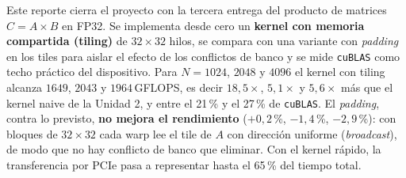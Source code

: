 \begin{abstractd}
	Este reporte cierra el proyecto con la tercera entrega del producto de matrices $C = A \times B$ en FP32. Se implementa desde cero un \textbf{kernel con memoria compartida (tiling)} de $32 \times 32$ hilos, se compara con una variante con \textit{padding} en los tiles para aislar el efecto de los conflictos de banco y se mide \texttt{cuBLAS} como techo práctico del dispositivo. Para $N = 1024$, $2048$ y $4096$ el kernel con tiling alcanza $1649$, $2043$ y $1964$\,GFLOPS, es decir $18{,}5\times$, $5{,}1\times$ y $5{,}6\times$ más que el kernel naive de la Unidad 2, y entre el 21\,\% y el 27\,\% de \texttt{cuBLAS}. El \textit{padding}, contra lo previsto, \textbf{no mejora el rendimiento} ($+0{,}2$\,\%, $-1{,}4$\,\%, $-2{,}9$\,\%): con bloques de $32 \times 32$ cada warp lee el tile de $A$ con dirección uniforme (\textit{broadcast}), de modo que no hay conflicto de banco que eliminar. Con el kernel rápido, la transferencia por PCIe pasa a representar hasta el 65\,\% del tiempo total.
\end{abstractd}
